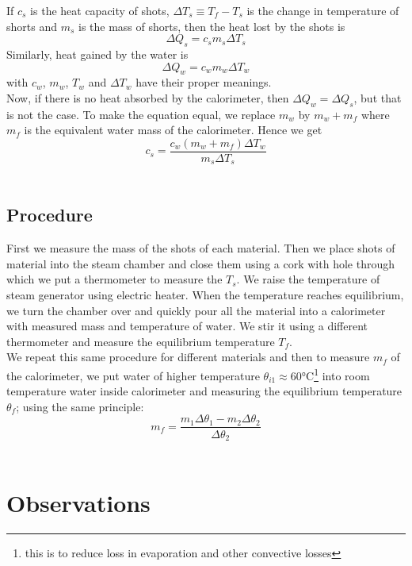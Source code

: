 \documentclass[%
 sor,
 jor,
 amsmath,amssymb,
 reprint,%
]{revtex4-2}
\begin{document}
If $c_s$ is the heat capacity of shots, $\Delta T_s \equiv T_f -T_s$ is the change in temperature of shorts and $m_s$ is the mass of shorts, then the heat lost by the shots is
$$\Delta Q_s = c_s m_s \Delta T_s$$
Similarly, heat gained by the water is
$$\Delta Q_w = c_w m_ w\Delta T_w$$
with $c_w$, $m_w$, $T_w$ and $\Delta T_w$ have their proper meanings.  \\ 

Now, if there is no heat absorbed by the calorimeter, then $\Delta Q_w = \Delta Q_s$, but that is not the case. To make the equation equal, we replace $m_w$ by $m_w+m_f$ where $m_f$ is the equivalent water mass of the calorimeter. Hence we get
\begin{equation}
c_s = \frac{c_w(m_w +m_f)\Delta T_w}{m_s \Delta T_s}
\end{equation} \\

\subsection{Procedure}
First we measure the mass of the shots of each material. Then we place shots of material into the steam chamber and close them using a cork with hole through which we put a thermometer to measure the $T_s$. We raise the temperature of steam generator using electric heater. When the temperature reaches equilibrium, we turn the chamber over and quickly pour all the material into a calorimeter with measured mass and temperature of water. We stir it using a different thermometer and measure the equilibrium temperature $T_f$. \\
We repeat this same procedure for different materials and then to measure $m_f$ of the calorimeter, we put water of higher temperature $\theta_{i1} \approx 60$\si{\celsius}\footnote{this is to reduce loss in evaporation and other convective losses} into room temperature water inside calorimeter and measuring the equilibrium temperature $\theta_f$; using the same principle:
\begin{equation}
m_f = \frac{m_1\Delta \theta_1 - m_2 \Delta \theta_2}{\Delta \theta_2}
\end{equation} \\

\section{Observations}
\end{document}
